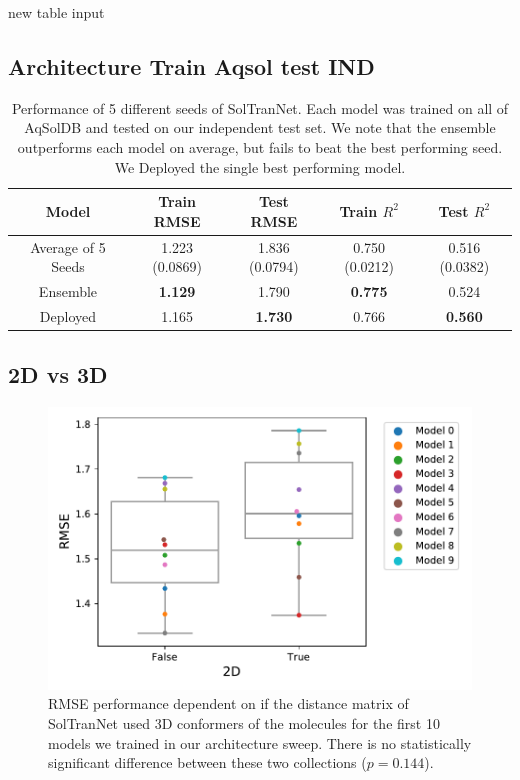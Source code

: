 \documentclass[journal=jmcmar,manuscript=article]{achemso}
\begin{document}
new table input

\subsection{Architecture Train Aqsol test IND}

\begin{table}
    \begin{tabular}{|c|c|c|c|c|}
        Model & Train RMSE & Test RMSE & Train $R^2$ & Test $R^2$ \\
        \hline
        Average of 5 Seeds & 1.223 (0.0869) & 1.836 (0.0794)  & 0.750 (0.0212) & 0.516 (0.0382)\\
        Ensemble & \textbf{1.129} & 1.790 & \textbf{0.775} & 0.524\\
        Deployed & 1.165 & \textbf{1.730} & 0.766 & \textbf{0.560}\\
        \hline
    \end{tabular}
    \caption{Performance of 5 different seeds of SolTranNet. Each model was trained on all of AqSolDB and tested on our independent test set. We note that the ensemble outperforms each model on average, but fails to beat the best performing seed. We Deployed the single best performing model.}
    \label{tab:deployed}
\end{table}

\subsection{2D vs 3D}

\begin{figure}[tb]
    \centering
    \includegraphics[width=\linewidth]{figures/2dv3d_rmse.pdf}
    \caption{RMSE performance dependent on if the distance matrix of SolTranNet used 3D conformers of the molecules for the first 10 models we trained in our architecture sweep. There is no statistically significant difference between these two collections ($p=0.144$).}
    \label{fig:2dv3drmse}
\end{figure}
\end{document}
